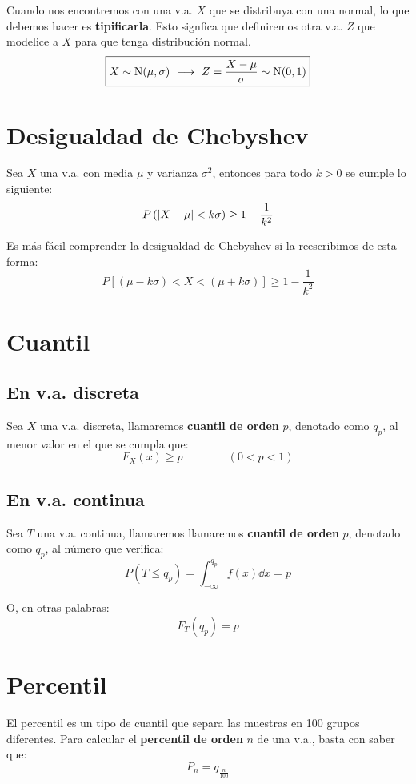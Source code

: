 \documentclass[a4paper]{book}
\begin{document}
Cuando nos encontremos con una v.a. $X$ que se distribuya con una normal, lo que debemos hacer es \textbf{tipificarla}. Esto signfica que definiremos otra v.a. $Z$ que modelice a $X$ para que tenga distribución normal.
\[\boxed{X \sim \operatorname{N}(\mu ,\sigma ) \ \longrightarrow \ Z = \frac{X-\mu}{\sigma} \sim \operatorname{N}(0,1)}\]

\section{Desigualdad de Chebyshev}
Sea $X$ una v.a. con media $\mu$ y varianza $\sigma ^2$, entonces para todo $k>0$ se cumple lo siguiente: \[P\left( \abs{X-\mu} < k\sigma \right)\geq 1 - \frac{1}{k^2}\]

\begin{nota}
	Es más fácil comprender la desigualdad de Chebyshev si la reescribimos de esta forma: \[ P\left[ (\mu - k\sigma )< X < (\mu +k\sigma ) \right] \geq 1 - \frac{1}{k^2}\]
\end{nota}


\section{Cuantil}
\subsection*{En v.a. discreta}
Sea $X$ una v.a. discreta, llamaremos \textbf{cuantil de orden} $p$, denotado como $q_p$, al menor valor en el que se cumpla que: \[F_X(x)\geq p \qquad \qquad \left( 0 < p < 1 \right) \]

\subsection*{En v.a. continua}
Sea $T$ una v.a. continua, llamaremos llamaremos \textbf{cuantil de orden} $p$, denotado como $q_p$, al número que verifica: \[P\left( T \leq q_p \right) = \int_{-\infty}^{q_p}{f(x)\dd{x}} = p\]

O, en otras palabras: \[\boxed{F_T(q_p)=p}\]


\section{Percentil}
El percentil es un tipo de cuantil que separa las muestras en 100 grupos diferentes. Para calcular el \textbf{percentil de orden} $n$ de una v.a., basta con saber que: \[P_n = q_{\frac{n}{100}}\]
\end{document}

